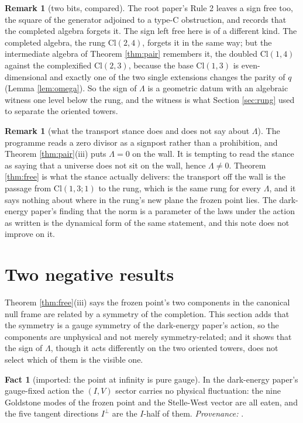 \documentclass[11pt]{article}
\theoremstyle{definition}
\newtheorem{remark}[theorem]{Remark}
\newtheorem{fact}[theorem]{Fact}
\newcommand{\Cl}{\mathrm{Cl}}
\begin{document}
\begin{remark}[two bits, compared]\label{rem:twobits}
The root paper's Rule 2 leaves a sign free too, the square of the generator adjoined to a type-C obstruction, and records that the completed algebra forgets it. The sign left free here is of a different kind. The completed algebra, the rung $\Cl(2,4)$, forgets it in the same way; but the intermediate algebra of Theorem \ref{thm:pair} remembers it, the doubled $\Cl(1,4)$ against the complexified $\Cl(2,3)$, because the base $\Cl(1,3)$ is even-dimensional and exactly one of the two single extensions changes the parity of $q$ (Lemma \ref{lem:omega}). So the sign of $\Lambda$ is a geometric datum with an algebraic witness one level below the rung, and the witness is what Section \ref{sec:rung} used to separate the oriented towers.
\end{remark}

\begin{remark}[what the transport stance does and does not say about $\Lambda$]\label{rem:stance}
The programme reads a zero divisor as a signpost rather than a prohibition, and Theorem \ref{thm:pair}(iii) puts $\Lambda = 0$ on the wall. It is tempting to read the stance as saying that a universe does not sit on the wall, hence $\Lambda \neq 0$. Theorem \ref{thm:free} is what the stance actually delivers: the transport off the wall is the passage from $\Cl(1,3;1)$ to the rung, which is the same rung for every $\Lambda$, and it says nothing about where in the rung's new plane the frozen point lies. The dark-energy paper's finding that the norm is a parameter of the laws under the action as written is the dynamical form of the same statement, and this note does not improve on it.
\end{remark}

\section{Two negative results}\label{sec:doors}

Theorem \ref{thm:free}(iii) says the frozen point's two components in the canonical null frame are related by a symmetry of the completion. This section adds that the symmetry is a gauge symmetry of the dark-energy paper's action, so the components are unphysical and not merely symmetry-related; and it shows that the sign of $\Lambda$, though it acts differently on the two oriented towers, does not select which of them is the visible one.

\begin{fact}[imported: the point at infinity is pure gauge]\label{fact:goldstone}
In the dark-energy paper's gauge-fixed action the $(I,V)$ sector carries no physical fluctuation: the nine Goldstone modes of the frozen point and the Stelle-West vector are all eaten, and the five tangent directions $I^{\perp}$ are the $I$-half of them. \emph{Provenance:} \cite[Prop.~5.4]{ButlerT10}.
\end{fact}
\end{document}
